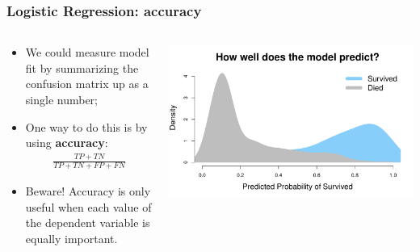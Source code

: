 \documentclass[aspectratio=169]{beamer}
\theoremstyle{principle}
\begin{document}
\begin{frame}
\frametitle{Logistic Regression: accuracy}

\begin{columns}
\begin{column}{0.5\textwidth}

\begin{itemize}
\item We could measure model fit by summarizing the confusion matrix up as a single number;
\bigskip
\bigskip

\item One way to do this is by using \textbf{accuracy}:
\begin{align*}
\frac{TP + TN}{TP + TN + FP + FN}
\end{align*}
\bigskip

\item[]\color{white} Beware!  Accuracy is only useful when each value of the dependent variable is equally important.

\end{itemize}

\end{column}
\begin{column}{0.5\textwidth}

\includegraphics[scale=0.35]{titanic_prediction_dens.pdf}

\end{column}
\end{columns}

\end{frame}
\end{document}
